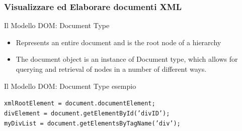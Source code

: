 
\begin{frame}
    \frametitle{Visualizzare ed Elaborare documenti XML}
    \addtocounter{nframe}{1}
    

     \begin{block}{Il Modello DOM: Document Type}
        \begin{itemize}
            \item Represents an entire document and is the root node of a hierarchy
            \item The document object is an instance of Document type, which allows for querying and retrieval of nodes in a number of different ways.
        \end{itemize}
     \end{block}

     \begin{block}{Il Modello DOM: Document Type esempio}

            \texttt{xmlRootElement = document.documentElement;}
            \\\texttt{divElement = document.getElementById('divID');}
            \\\texttt{myDivList = document.getElementsByTagName('div');}
       
     \end{block}

\end{frame}


